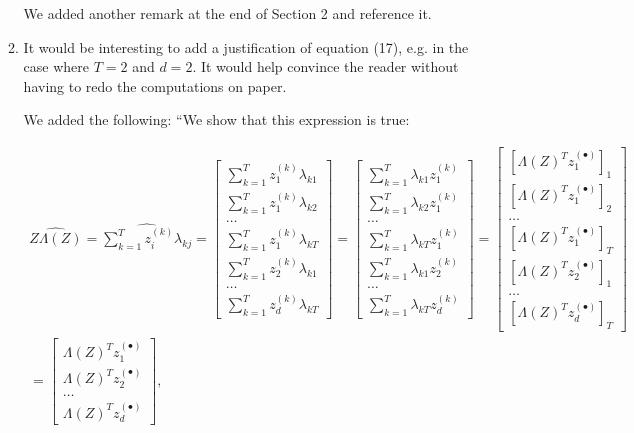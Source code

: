 \documentclass{article}
\begin{document}
\begin{enumerate}
\begin{enumerate}[label=\arabic*.]
    {\color{mred} We added another remark at the end of Section 2 and reference it.}
\item It would be interesting to add a justification of equation (17), e.g. in the case where $T = 2$ and $d = 2$. It would help convince the reader without having to redo the computations on paper.

    {\color{mred} We added the following: ``We show that this expression is true:

    \begin{multline*}
        \widehat{Z\Lambda(Z)} = \widehat{\sum_{k=1}^Tz_i^{(k)}\lambda_{kj}} = \begin{bmatrix} \sum_{k=1}^T z_1^{(k)}\lambda_{k1} \\ \sum_{k=1}^T z_1^{(k)}\lambda_{k2} \\ \ldots \\ \sum_{k=1}^T z_1^{(k)}\lambda_{kT} \\ \sum_{k=1}^T z_2^{(k)}\lambda_{k1} \\ \ldots \\ \sum_{k=1}^T z_d^{(k)}\lambda_{kT} \end{bmatrix} = \begin{bmatrix} \sum_{k=1}^T \lambda_{k1}z_1^{(k)} \\ \sum_{k=1}^T \lambda_{k2}z_1^{(k)} \\ \ldots \\ \sum_{k=1}^T \lambda_{kT}z_1^{(k)} \\ \sum_{k=1}^T \lambda_{k1}z_2^{(k)} \\ \ldots \\ \sum_{k=1}^T \lambda_{kT}z_d^{(k)} \end{bmatrix} = \begin{bmatrix} [\Lambda(Z)^T z_1^{(\bullet)}]_1 \\ [\Lambda(Z)^T z_1^{(\bullet)}]_2 \\ \ldots \\ [\Lambda(Z)^T z_1^{(\bullet)}]_T \\ [\Lambda(Z)^T z_2^{(\bullet)}]_1 \\ \ldots \\ [\Lambda(Z)^T z_d^{(\bullet)}]_T \end{bmatrix} \\ = \begin{bmatrix} \Lambda(Z)^Tz_1^{(\bullet)} \\ \Lambda(Z)^Tz_2^{(\bullet)} \\ \ldots \\ \Lambda(Z)^Tz_d^{(\bullet)} \end{bmatrix},    \end{multline*}
    
}
\end{enumerate}
\end{enumerate}
\end{document}
